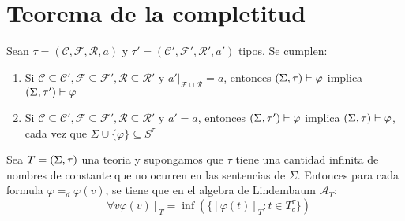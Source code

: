 
\section{Teorema de la completitud}

\begin{lemma}
  Sean $\tau=(\mathcal{C},\mathcal{F},\mathcal{R},a)$ y $\tau'=(\mathcal{C}',\mathcal{F}',\mathcal{R}',a')$ tipos. Se cumplen: \begin{enumerate}
    \item Si $\mathcal{C}\subseteq\mathcal{C}', \mathcal{F}\subseteq\mathcal{F}',\mathcal{R}\subseteq\mathcal{R}'$ y $a'|_{\mathcal{F}\cup\mathcal{R}}=a$,
    entonces $(\Sigma,\tau)\vdash\varphi$ implica $(\Sigma,\tau')\vdash\varphi$
    \item Si $\mathcal{C}\subseteq\mathcal{C}', \mathcal{F}\subseteq\mathcal{F}',\mathcal{R}\subseteq\mathcal{R}'$ y $a'=a$, entonces $(\Sigma,\tau')\vdash\varphi$
    implica $(\Sigma,\tau)\vdash\varphi$, cada vez que $\Sigma\cup\{\varphi\}\subseteq S^\tau$
  \end{enumerate} 
\end{lemma}
\noproof

\begin{lemma}
  Sea $T=(\Sigma,\tau)$ una teoria y supongamos que $\tau$ tiene una cantidad infinita de nombres de constante que no ocurren en las sentencias de $\Sigma$.
  Entonces para cada formula $\varphi=_d\varphi(v)$, se tiene que en el algebra de Lindembaum $\mathcal{A}_T$:
  $$
  [\forall v\varphi(v)]_T=\inf(\{[\varphi(t)]_T:t\in T_c^\tau\})
  $$
  
\end{lemma}

\noproof

